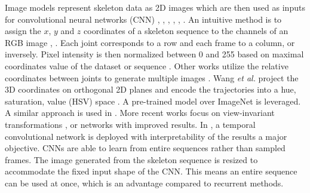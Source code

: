 \documentclass[letterpaper, 10 pt, conference]{ieeeconf}
\begin{document}
Image models represent skeleton data as 2D images which are then used as inputs for convolutional neural networks (CNN) \cite{du2015skeleton}, \cite{ke2017new}, \cite{kim2017interpretable}, \cite{li2017skeleton}, \cite{liu2017enhanced}, \cite{wang2016action}. An intuitive method is to assign the $x$, $y$ and $z$ coordinates of a skeleton sequence to the channels of an RGB image \cite{du2015skeleton}, \cite{li2017skeleton}. Each joint corresponds to a row and each frame to a column, or inversely. Pixel intensity is then normalized between 0 and 255 based on maximal coordinates value of the dataset \cite{du2015skeleton} or sequence \cite{li2017skeleton}. Other works utilize the relative coordinates between joints to generate multiple images \cite{ke2017new}. Wang \textit{et al.} project the 3D coordinates on orthogonal 2D planes and encode the trajectories into a hue, saturation, value (HSV) space \cite{wang2016action}. A pre-trained model over ImageNet \cite{deng2009imagenet} is leveraged. A similar approach is used in \cite{hou2016skeleton}. More recent works focus on view-invariant transformations \cite{ke2017skeletonnet}, \cite{liu2017enhanced} or networks \cite{zhang2019view} with improved results. In \cite{kim2017interpretable}, a temporal convolutional network is deployed with interpretability of the results a major objective. CNNs are able to learn from entire sequences rather than sampled frames. The image generated from the skeleton sequence is resized to accommodate the fixed input shape of the CNN. This means an entire sequence can be used at once, which is an advantage compared to recurrent methods. 
\end{document}
